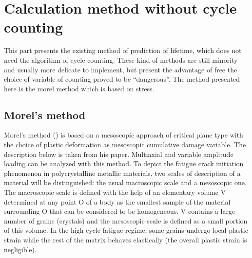 \section{Calculation method without cycle counting}
This part presents the existing method of prediction of lifetime, which does not need the algorithm of cycle counting. These kind of methods are still minority and usually more delicate to implement, but present the advantage of free the choice of variable of counting proved to be ``dangerous''. The method presented here is the morel method which is based on stress.

\subsection{Morel's method}
Morel's method (\cite{Morel2000101}) is based on a mesoscopic approach of critical plane type with the
choice of plastic deformation as mesoscopic cumulative damage variable. The description below is taken from his paper. Multiaxial and variable amplitude loading can be analyzed with this method.
To depict the fatigue crack initiation phenomenon in polycrystalline metallic materials, two scales of description of a material will be distinguished: the usual macroscopic scale and a mesoscopic one. The macroscopic scale is defined with the help of an elementary volume
V determined at any point O of a body as the smallest sample of the material surrounding O that can be considered to be homogeneous. V contains a large number of grains (crystals) and the
mesoscopic scale is defined as a small portion of this
volume. In the high cycle fatigue regime, some grains
undergo local plastic strain while the rest of the matrix
behaves elastically (the overall plastic strain is
negligible).

